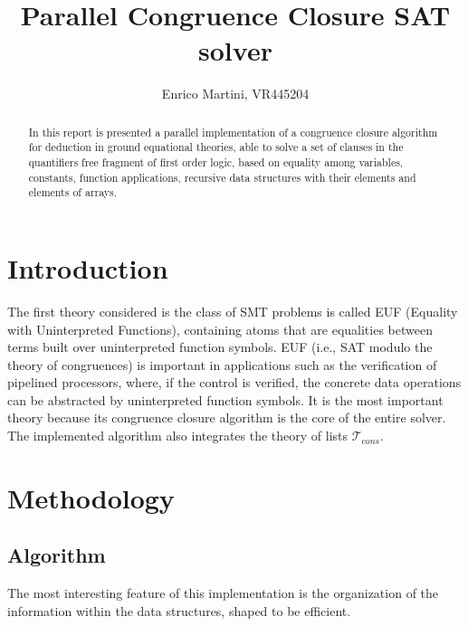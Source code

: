 \documentclass{IEEEtran}
\begin{document}
\title{Parallel Congruence Closure SAT solver}
\author{Enrico Martini, VR445204}
\maketitle
\begin{abstract}
 In this report is presented a parallel implementation of a congruence closure algorithm for deduction in ground equational theories, able to solve a set of clauses in the quantifiers free fragment of first order logic, based on equality among variables, constants, function applications, recursive data structures with their elements and elements of arrays.
\end{abstract}
\section{Introduction}
The first theory considered is the class of SMT problems is called EUF (Equality with Uninterpreted Functions), containing atoms that are equalities between terms built over uninterpreted function symbols. EUF (i.e., SAT modulo the theory of congruences) is important in applications such as the verification of pipelined processors, where, if the control is verified, the concrete data operations can be abstracted by uninterpreted function symbols.\cite{NIEUWENHUIS2007557} It is the most important theory because its congruence closure algorithm is the core of the entire solver. The implemented algorithm also integrates the theory of lists $\mathcal{T}_{cons}$. 
\section{Methodology}


\subsection{Algorithm}
The most interesting feature of this implementation is the organization of the information within the data structures, shaped to be efficient.
\end{document}
